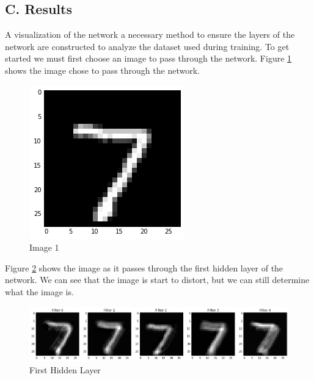 \documentclass[conference,final,]{IEEEtran}
\begin{document}
\subsection{C. Results}\label{c.-results}

A visualization of the network a necessary method to ensure the layers
of the network are constructed to analyze the dataset used during
training. To get started we must first choose an image to pass through
the network. Figure \ref{fig:image-1} shows the image chose to pass
through the network.

\begin{figure}
  \includegraphics[width=\linewidth]{../images/image-1.png}
  \caption{Image 1}
  \label{fig:image-1}
\end{figure}

Figure \ref{fig:hl1} shows the image as it passes through the first
hidden layer of the network. We can see that the image is start to
distort, but we can still determine what the image is.

\begin{figure}
  \includegraphics[width=\linewidth]{../images/hl1.png}
  \caption{First Hidden Layer}
  \label{fig:hl1}
\end{figure}
\end{document}
